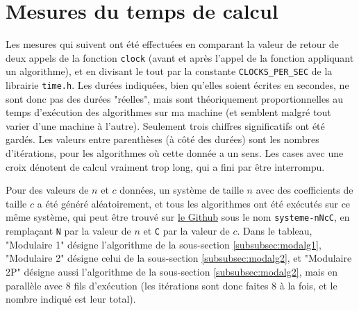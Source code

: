 \documentclass[french]{article}
\begin{document}
\section{Mesures du temps de calcul} \label{sec:tps}
Les mesures qui suivent ont été effectuées en comparant la valeur de retour de deux appels de la fonction {\tt clock} (avant et après l'appel de la fonction appliquant un algorithme), et en divisant le tout par la constante {\tt CLOCKS\_PER\_SEC} de la librairie {\tt time.h}. Les durées indiquées, bien qu'elles soient écrites en secondes, ne sont donc pas des durées "réelles", mais sont théoriquement proportionnelles au temps d'exécution des algorithmes sur ma machine (et semblent malgré tout varier d'une machine à l'autre). Seulement trois chiffres significatifs ont été gardés.
Les valeurs entre parenthèses (à côté des durées) sont les nombres d'itérations, pour les algorithmes où cette donnée a un sens. Les cases avec une croix dénotent de calcul vraiment trop long, qui a fini par être interrompu.
\par
Pour des valeurs de $n$ et $c$ données, un système de taille $n$ avec des coefficients de taille $c$ a été généré aléatoirement, et tous les algorithmes ont été exécutés sur ce même système, qui peut être trouvé sur \href{https://github.com/Barni072/TER}{le Github} sous le nom {\tt systeme-nNcC}, en remplaçant {\tt N} par la valeur de $n$ et {\tt C} par la valeur de $c$.
Dans le tableau, "Modulaire 1" désigne l'algorithme de la sous-section \ref{subsubsec:modalg1}, "Modulaire 2" désigne celui de la sous-section \ref{subsubsec:modalg2}, et "Modulaire 2P" désigne aussi l'algorithme de la sous-section \ref{subsubsec:modalg2}, mais en parallèle avec 8 fils d'exécution (les itérations sont donc faites 8 à la fois, et le nombre indiqué est leur total).
\vspace{0,2cm}
\newline
\end{document}
